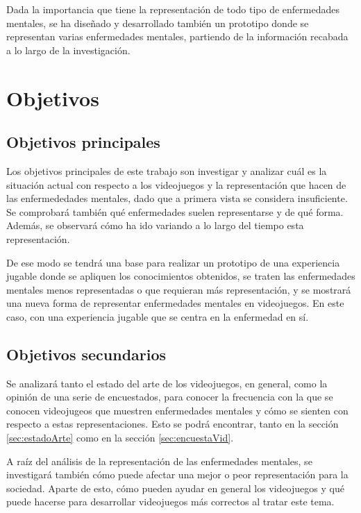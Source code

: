 \documentclass[12pt, a4paper,twoside,titlepage]{book}
\begin{document}
Dada la importancia que tiene la representación de todo tipo de enfermedades mentales, se ha diseñado y desarrollado también un prototipo donde se representan varias enfermedades mentales, partiendo de la información recabada a lo largo de la investigación.

\chapter{Objetivos}


\section{Objetivos principales}

    Los objetivos principales de este trabajo son investigar y analizar cuál es la situación actual con respecto a los videojuegos y la representación que hacen de las enfermededades mentales, dado que a primera vista se considera insuficiente. Se comprobará también qué enfermedades suelen representarse y de qué forma. Además, se observará cómo ha ido variando a lo largo del tiempo esta representación.
    
    De ese modo se tendrá una base para realizar un prototipo de una experiencia jugable donde se apliquen los conocimientos obtenidos, se traten las enfermedades mentales menos representadas o que requieran más representación, y se mostrará una nueva forma de representar enfermedades mentales en videojuegos. En este caso, con una experiencia jugable que se centra en la enfermedad en sí.
    
   
    \section{Objetivos secundarios}
    
     Se analizará tanto el estado del arte de los videojuegos, en general, como la opinión de una serie de encuestados, para conocer la frecuencia con la que se conocen videojugeos que muestren enfermedades mentales y cómo se sienten con respecto a estas representaciones. Esto se podrá encontrar, tanto en la sección \ref{sec:estadoArte} como en la sección \ref{sec:encuestaVid}.       
       
     A raíz del análisis de la representación de las enfermedades mentales, se investigará también cómo puede afectar una mejor o peor representación para la sociedad. Aparte de esto, cómo pueden ayudar en general los videojuegos y qué puede hacerse para desarrollar videojuegos más correctos al tratar este tema.   
     
\end{document}
